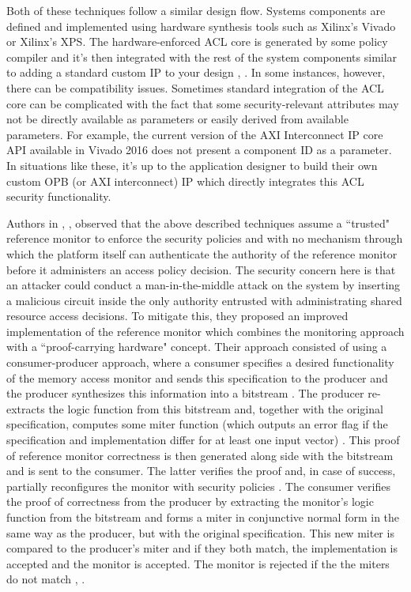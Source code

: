 \documentclass[sigconf]{acmart}
\theoremstyle{plain}
\theoremstyle{remark}
\begin{document}
Both of these techniques follow a similar design flow. Systems components are defined and implemented using hardware synthesis tools such as Xilinx's Vivado or Xilinx's XPS.  The hardware-enforced ACL core is generated by some policy compiler and it's then integrated with the rest of the system components similar to adding a standard custom IP to your design \cite{SPHuffmire}, \cite{Huffmire}. In some instances, however, there can be compatibility issues. Sometimes standard integration of the ACL core can be complicated with the fact that some security-relevant attributes may not be directly available as parameters or easily derived from available parameters. For example, the current version of the AXI Interconnect IP core API available in Vivado 2016 does not present a component ID as a parameter. In situations like these, it's up to the application designer to build their own custom OPB (or AXI interconnect) IP which directly integrates this ACL security functionality.

Authors in \cite{proofcarrying}, \cite{proof}, \cite{proofcar} observed that the above described techniques assume a ``trusted" reference monitor to enforce the security policies and with no mechanism through which the platform itself can authenticate the authority of the reference monitor before it administers an access policy decision. The security concern here is that an attacker could conduct a man-in-the-middle attack on the system by inserting a malicious circuit inside the only authority entrusted with administrating shared resource access decisions. To mitigate this, they proposed an improved implementation of the reference monitor which combines the monitoring approach with a ``proof-carrying hardware" concept. Their approach consisted of using a consumer-producer approach, where a consumer specifies a desired functionality of the memory access monitor and sends this specification to the producer and the producer synthesizes this information into a bitstream \cite{proofcarrying}. The producer re-extracts the logic function from this bitstream and, together with the original specification, computes some miter function (which outputs an error flag if the specification and implementation differ for at least one input vector) \cite{proof}. This proof of reference monitor correctness is then generated along side with the bitstream and is sent to the consumer. The latter verifies the proof and, in case of success, partially reconfigures the monitor with security policies \cite{proof}. The consumer verifies the proof of correctness from the producer by extracting the monitor's logic function from the bitstream and forms a miter in conjunctive normal form in the same way as the producer, but with the original specification. This new miter is compared to the producer's miter and if they both match, the implementation is accepted and the monitor is accepted. The monitor is rejected if the the miters do not match \cite{proof}, \cite{proofcar}.
\end{document}
